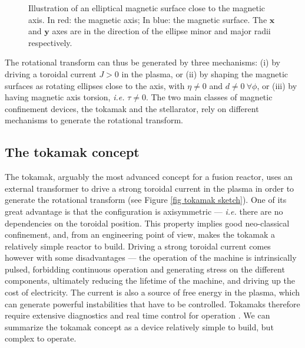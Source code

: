 \documentclass[my_thesis.tex]{subfiles}
\begin{document}
\begin{figure}
    \centering
    \caption{Illustration of an elliptical magnetic surface close to the magnetic axis. In red: the magnetic axis; In blue: the magnetic surface. The $\mathbf{x}$ and $\mathbf{y}$ axes are in the direction of the ellipse minor and major radii respectively.}
    \label{fig.near axis expansion}
\end{figure}


The rotational transform can thus be generated by three mechanisms: (i) by driving a toroidal current $J>0$ in the plasma, or (ii) by shaping the magnetic surfaces as rotating ellipses close to the axis, with $\eta\neq 0$ and $d\neq 0\ \forall\phi$, or (iii) by having magnetic axis torsion, \textit{i.e.} $\tau\neq 0$. The two main classes of magnetic confinement devices, the tokamak and the stellarator, rely on different mechanisms to generate the rotational transform.

\subsection{The tokamak concept}
The tokamak, arguably the most advanced concept for a fusion reactor, uses an external transformer to drive a strong toroidal current in the plasma in order to generate the rotational transform (see Figure \ref{fig tokamak sketch}). One of its great advantage is that the configuration is axisymmetric --- \textit{i.e.} there are no dependencies on the toroidal position. This property implies good neo-classical confinement, and, from an engineering point of view, makes the tokamak a relatively simple reactor to build. Driving a strong toroidal current comes however with some disadvantages --- the operation of the machine is intrinsically pulsed, forbidding continuous operation and generating stress on the different components, ultimately reducing the lifetime of the machine, and driving up the cost of electricity. The current is also a source of free energy in the plasma, which can generate powerful instabilities that have to be controlled. Tokamaks therefore require extensive diagnostics and real time control for operation \citep{degraveMagneticControlTokamak2022}. We can summarize the tokamak concept as a device relatively simple to build, but complex to operate.
\end{document}
